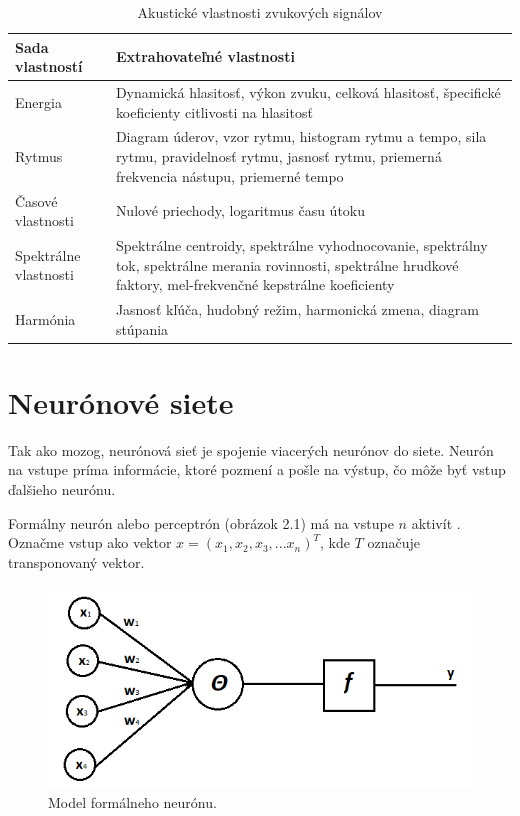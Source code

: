 \begin{table}[]
\centering
\caption{Akustické vlastnosti zvukových signálov}
\label{features_table}
\begin{tabular}{l p{10cm}}
\hline
\textbf{Sada vlastností} & \textbf{Extrahovateľné vlastnosti}                                                                                                                                                                             \\ \hline
Energia                  & Dynamická hlasitosť, výkon zvuku, celková hlasitosť, špecifické koeficienty citlivosti na hlasitosť                                                                  \\
Rytmus                   & Diagram úderov, vzor rytmu, histogram rytmu a tempo, sila rytmu, pravidelnosť rytmu, jasnosť rytmu, priemerná frekvencia nástupu, priemerné tempo                  \\
Časové vlastnosti        & Nulové priechody, logaritmus času útoku                                                                                                                                                                        \\
Spektrálne vlastnosti    & Spektrálne centroidy, spektrálne vyhodnocovanie, spektrálny tok, spektrálne merania rovinnosti, spektrálne hrudkové faktory, mel-frekvenčné kepstrálne koeficienty \\
Harmónia                 & Jasnosť kľúča, hudobný režim, harmonická zmena, diagram stúpania                                                                                                     \\ \hline
\end{tabular}
\end{table}

\section{Neurónové siete}
Tak ako mozog, neurónová sieť je spojenie viacerých neurónov do siete.
Neurón na vstupe príma informácie, ktoré pozmení a pošle na výstup, čo môže byť vstup ďalšieho neurónu.

Formálny neurón alebo perceptrón (obrázok 2.1) má na vstupe \(n\) aktivít \cite{NNKvasnicka}.
Označme vstup ako vektor \(x = (x_1, x_2, x_3, ... x_n)^T\), kde \(T\) označuje transponovaný vektor.

\begin{figure}[!ht] 
	\centering 
	\includegraphics[width=.6\textwidth]{figures/perceptron} 
	\caption{Model formálneho neurónu.} 
\end{figure}

